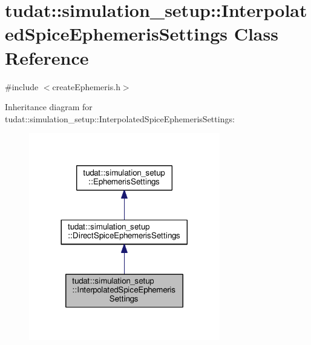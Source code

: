 \hypertarget{classtudat_1_1simulation__setup_1_1InterpolatedSpiceEphemerisSettings}{}\section{tudat\+:\+:simulation\+\_\+setup\+:\+:Interpolated\+Spice\+Ephemeris\+Settings Class Reference}
\label{classtudat_1_1simulation__setup_1_1InterpolatedSpiceEphemerisSettings}


{\ttfamily \#include $<$create\+Ephemeris.\+h$>$}



Inheritance diagram for tudat\+:\+:simulation\+\_\+setup\+:\+:Interpolated\+Spice\+Ephemeris\+Settings\+:
\nopagebreak
\begin{figure}[H]
\begin{center}
\leavevmode
\includegraphics[width=236pt]{classtudat_1_1simulation__setup_1_1InterpolatedSpiceEphemerisSettings__inherit__graph}
\end{center}
\end{figure}


